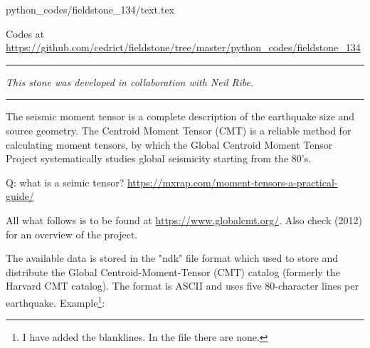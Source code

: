 \begin{flushright} {\tiny {\color{gray} python\_codes/fieldstone\_134/text.tex}} \end{flushright}

%

\begin{center}
\inpython Codes at \url{https://github.com/cedrict/fieldstone/tree/master/python_codes/fieldstone_134}
\end{center}

\par\noindent\rule{\textwidth}{0.4pt}

{\sl This stone was developed in collaboration with Neil Ribe}. 

\par\noindent\rule{\textwidth}{0.4pt}

The seismic moment tensor is a complete description of the earthquake size and source geometry. 
The Centroid Moment Tensor (CMT) is a reliable method for calculating moment tensors, 
by which the Global Centroid Moment Tensor Project systematically studies global seismicity 
starting from the 80's.

Q: what is a seimic tensor? \url{https://mxrap.com/moment-tensors-a-practical-guide/}


All what follows is to be found at \url{https://www.globalcmt.org/}.
Also check \textcite{eknd12} (2012) for an overview of the project.

The available data is stored in the "ndk" file format which used to store
and distribute the Global Centroid-Moment-Tensor (CMT) catalog
(formerly the Harvard CMT catalog).
The format is ASCII and uses five 80-character lines per earthquake. 
Example\footnote{I have added the blanklines. In the file there are none.}:

